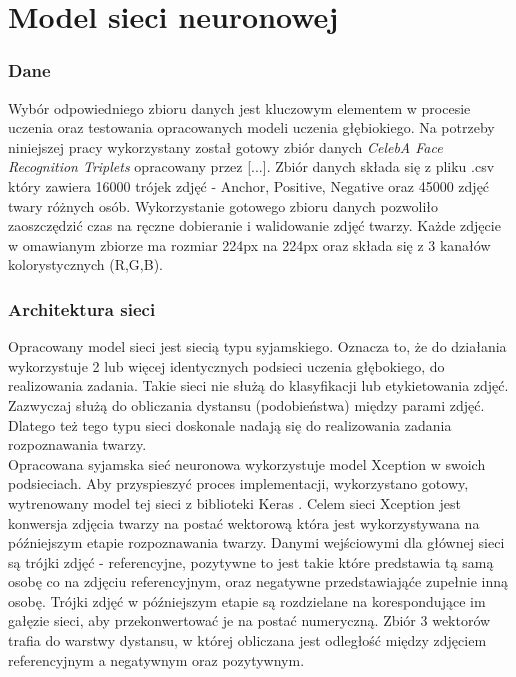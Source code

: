 \section{Model sieci neuronowej}
\subsubsection{Dane}
Wybór odpowiedniego zbioru danych jest kluczowym elementem w procesie uczenia oraz testowania opracowanych modeli uczenia głębiokiego. Na potrzeby niniejszej pracy wykorzystany został gotowy zbiór danych \emph{CelebA Face Recognition Triplets} opracowany przez [...]. Zbiór danych składa się z pliku .csv który zawiera 16000 trójek zdjęć - Anchor, Positive, Negative oraz 45000 zdjęć twary różnych osób. Wykorzystanie gotowego zbioru danych pozwoliło zaoszczędzić czas na ręczne dobieranie i walidowanie zdjęć twarzy.
Każde zdjęcie w omawianym zbiorze ma rozmiar 224px na 224px oraz składa się z 3 kanałów kolorystycznych (R,G,B).
\subsubsection{Architektura sieci}
Opracowany model sieci jest siecią typu syjamskiego. Oznacza to, że do działania wykorzystuje 2 lub więcej identycznych podsieci uczenia głębokiego, do realizowania zadania. Takie sieci nie służą do klasyfikacji lub etykietowania zdjęć. Zazwyczaj służą do obliczania dystansu (podobieństwa) między parami zdjęć. Dlatego też tego typu sieci doskonale nadają się do realizowania zadania rozpoznawania twarzy. \\
Opracowana syjamska sieć neuronowa wykorzystuje model Xception w swoich podsieciach. Aby przyspieszyć proces implementacji, wykorzystano gotowy, wytrenowany model tej sieci z biblioteki Keras \cite{chollet2015keras}. Celem sieci Xception jest konwersja zdjęcia twarzy na postać wektorową która jest wykorzystywana na późniejszym etapie rozpoznawania twarzy.
Danymi wejściowymi dla głównej sieci są trójki zdjęć - referencyjne, pozytywne to jest takie które predstawia tą samą osobę co na zdjęciu referencyjnym, oraz negatywne przedstawiająće zupełnie inną osobę. Trójki zdjęć w późniejszym etapie są rozdzielane na korespondujące im gałęzie sieci, aby przekonwertować je na postać numeryczną. Zbiór 3 wektorów trafia do warstwy dystansu, w której obliczana jest odległość między zdjęciem referencyjnym a negatywnym oraz pozytywnym. 
